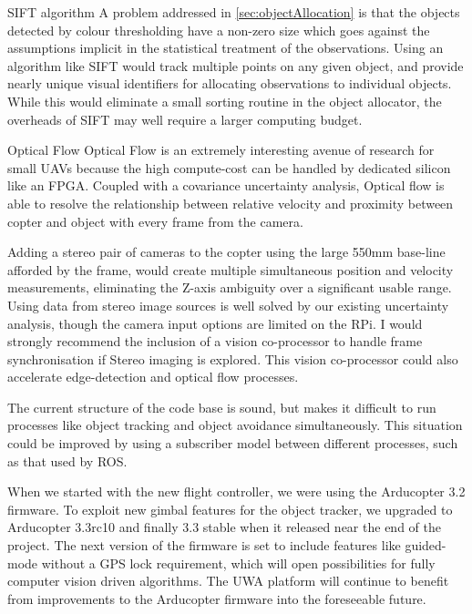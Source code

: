 \documentclass[a4paper, 11pt, titlepage]{article}
\begin{document}
  SIFT algorithm
  A problem addressed in \ref{sec:objectAllocation} is that the objects detected by colour thresholding have a non-zero size which goes against the assumptions implicit in the statistical treatment of the observations.  Using an algorithm like SIFT would track multiple points on any given object, and provide nearly unique visual identifiers for allocating observations to individual objects.  While this would eliminate a small sorting routine in the object allocator, the overheads of SIFT may well require a larger computing budget.

  Optical Flow
  Optical Flow is an extremely interesting avenue of research for small UAVs because the high compute-cost can be handled by dedicated silicon like an FPGA.  Coupled with a covariance uncertainty analysis, Optical flow is able to resolve the relationship between relative velocity and proximity between copter and object with every frame from the camera.  

  Adding a stereo pair of cameras to the copter using the large 550mm base-line afforded by the frame, would create multiple simultaneous position and velocity measurements, eliminating the Z-axis ambiguity over a significant usable range.  
  Using data from stereo image sources is well solved by our existing uncertainty analysis, though the camera input options are limited on the RPi. I would strongly recommend the inclusion of a vision co-processor to handle frame synchronisation if Stereo imaging is explored.  This vision co-processor could also accelerate edge-detection and optical flow processes.

  The current structure of the code base is sound, but makes it difficult to run processes like object tracking and object avoidance simultaneously.  This situation could be improved by using a subscriber model between different processes, such as that used by ROS.

  When we started with the new flight controller, we were using the Arducopter 3.2 firmware. To exploit new gimbal features for the object tracker, we upgraded to Arducopter 3.3rc10 and finally 3.3 stable when it released near the end of the project.  The next version of the firmware is set to include features like guided-mode without a GPS lock requirement, which will open possibilities for fully computer vision driven algorithms.  The UWA platform will continue to benefit from improvements to the Arducopter firmware into the foreseeable future.
\end{document}
